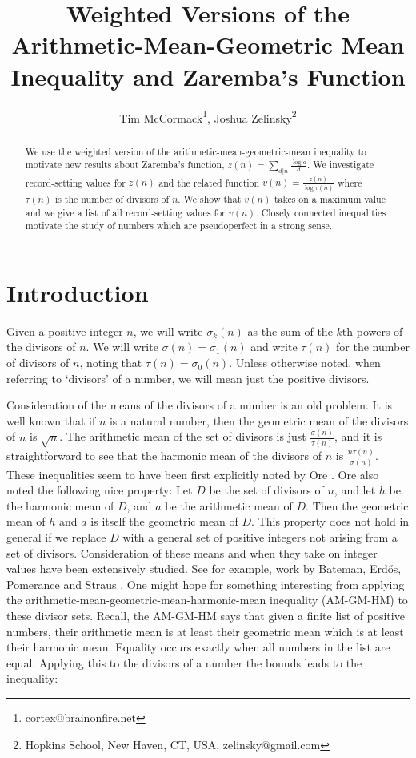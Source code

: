 \documentclass{article}
\title{Weighted Versions of the Arithmetic-Mean-Geometric Mean Inequality and Zaremba's Function}
\author{Tim McCormack\footnote{cortex@brainonfire.net}, Joshua Zelinsky\footnote{Hopkins School, New Haven, CT, USA,  zelinsky@gmail.com}}
\date{}
\begin{document}
\maketitle

\begin{abstract} We use the weighted version of the arithmetic-mean-geometric-mean inequality to motivate new results about Zaremba's function, $z(n) = \sum_{d|n} \frac{\log d}{d}$. We investigate record-setting values for $z(n)$ and the related function $v(n) = \frac{z(n)}{\log \tau(n)}$ where $\tau(n)$ is the number of divisors of $n$. We show that $v(n)$ takes on a maximum value and we give a list of all record-setting values for $v(n)$. Closely connected inequalities motivate the study of numbers which are pseudoperfect in a strong sense.
\end{abstract} 


\section{Introduction}
Given a positive integer $n$, we will write $\sigma_k(n)$ as the sum of the $k$th powers of the divisors of $n$. We will write $\sigma(n)=\sigma_1(n)$ and write $\tau(n)$ for the number of divisors of $n$, noting that $\tau(n)=\sigma_0(n)$. Unless otherwise noted, when referring to `divisors' of a number, we will mean just the positive divisors.

Consideration of the means of the divisors of a number is an old problem. It is well known that if $n$ is a natural number, then the geometric mean of the divisors of $n$ is $\sqrt{n}$. The arithmetic mean of the set of divisors is just $\frac{\sigma(n)}{\tau(n)}$, and it is straightforward to see that the harmonic mean of the divisors of $n$ is 
$\frac{n\tau(n)}{\sigma(n)}$. These inequalities seem to have been first explicitly noted by Ore \cite{Ore1}. Ore also noted the following nice property: Let $D$ be the set of divisors of $n$, and let $h$ be the harmonic mean of $D$, and $a$ be the arithmetic mean of $D$. Then the  geometric mean of $h$ and $a$ is itself the geometric mean of $D$. This property does not hold in general if we replace $D$ with a general set of positive integers not arising from a set of divisors. Consideration of these means and when they take on integer values have been extensively studied. See for example, work by Bateman,  Erd\H{o}s, Pomerance and Straus \cite{BEPS}.  One might hope for something interesting from applying the arithmetic-mean-geometric-mean-harmonic-mean inequality (AM-GM-HM) to these divisor sets. Recall, the AM-GM-HM says that given a finite list of positive numbers, their arithmetic mean is at least their geometric mean which is at least their harmonic mean. Equality occurs exactly when all numbers in the list are equal. Applying this to the divisors of a number the bounds leads to the inequality: 
\end{document}
